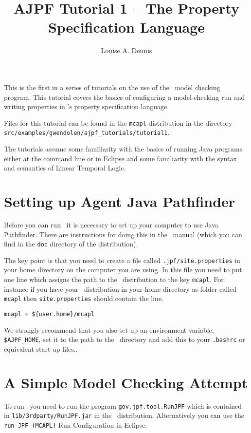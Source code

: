 \documentclass[a4]{article}
\author{Louise A. Dennis}
\title{AJPF Tutorial 1 -- The Property Specification Language}
\begin{document}
\maketitle
This is the first in a series of tutorials on the use of the \ajpf\ model checking program.  This tutorial covers the basics of configuring a model-checking run and writing properties in \ajpf's property specification language.

Files for this tutorial can be found in the \texttt{mcapl} distribution in the directory \texttt{src/examples/gwendolen/ajpf\_tutorials/tutorial1}.

The tutorials assume some familiarity with the basics of running Java programs either at the command line or in Eclipse and some familiarity with the syntax and semantics of Linear Temporal Logic.

\section{Setting up Agent Java Pathfinder}
Before you can run \ajpf\ it is necessary to set up your computer to use Java Pathfinder.  There are instructions for doing this in the \mcapl\ manual (which you can find in the \texttt{doc} directory of the distribution).

The key point is that you need to create a file called \texttt{.jpf/site.properties} in your home directory on the computer you are using.  In this file you need to put one line which assigns the path to the \mcapl\ distribution to the key \texttt{mcapl}.  For instance if you have your \mcapl\ distribution in your home directory as  folder called \texttt{mcapl} then \texttt{site.properties} should contain the line.

\begin{verbatim}
mcapl = ${user.home}/mcapl
\end{verbatim}

We strongly recommend that you also set up an environment variable, \texttt{\$AJPF\_HOME}, set it to the path to the \mcapl\ directory and add this to your \texttt{.bashrc} or equivalent start-up files..

\section{A Simple Model Checking Attempt}

To run \ajpf\ you need to run the program \texttt{gov.jpf.tool.RunJPF} which is contained in \texttt{lib/3rdparty/RunJPF.jar} in the \mcapl\ distribution.  Alternatively you can use the \texttt{run-JPF (MCAPL)} Run Configuration in Eclipse.
\end{document}
